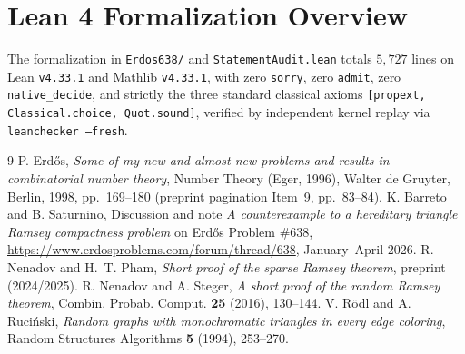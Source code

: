 \documentclass[11pt]{amsart}
\theoremstyle{definition}
\theoremstyle{remark}
\begin{document}
\section{Lean 4 Formalization Overview}

The formalization in \texttt{Erdos638/} and \texttt{StatementAudit.lean} totals $5{,}727$ lines on Lean \texttt{v4.33.1} and Mathlib \texttt{v4.33.1}, with zero \texttt{sorry}, zero \texttt{admit}, zero \texttt{native\_decide}, and strictly the three standard classical axioms \texttt{[propext, Classical.choice, Quot.sound]}, verified by independent kernel replay via \texttt{leanchecker --fresh}.

\begin{thebibliography}{9}
 P. Erd\H{o}s, \emph{Some of my new and almost new problems and results in combinatorial number theory}, Number Theory (Eger, 1996), Walter de Gruyter, Berlin, 1998, pp.~169--180 (preprint pagination Item~9, pp.~83--84).
 K. Barreto and B. Saturnino, Discussion and note \emph{A counterexample to a hereditary triangle Ramsey compactness problem} on Erd\H{o}s Problem \#638, \url{https://www.erdosproblems.com/forum/thread/638}, January--April 2026.
 R. Nenadov and H.~T. Pham, \emph{Short proof of the sparse Ramsey theorem}, preprint (2024/2025).
 R. Nenadov and A. Steger, \emph{A short proof of the random Ramsey theorem}, Combin. Probab. Comput. \textbf{25} (2016), 130--144.
 V. R\"odl and A. Ruci\'nski, \emph{Random graphs with monochromatic triangles in every edge coloring}, Random Structures Algorithms \textbf{5} (1994), 253--270.
\end{thebibliography}
\end{document}
